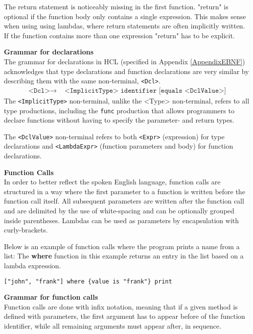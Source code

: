 The return statement is noticeably missing in the first function.
"return" is optional if the function body only contains a single expression. 
This makes sense when using using lambdas, where return statements are often implicitly written. 
If the function contains more than one expression "return" has to be explicit.


\textbf{Grammar for declarations}\\
The grammar for declarations in HCL (specified in Appendix \ref{AppendixEBNF}) acknowledges that type declarations and function declarations are very similar by describing them with the same non-terminal, \texttt{<Dcl>}.
\begin{align*}
	\texttt{<Dcl>}\to & \texttt{ <ImplicitType> identifier [equals <DclValue>]}
\end{align*}
The \texttt{<ImplicitType>} non-terminal, unlike the <Type> non-terminal, refers to all type productions, including the \texttt{func} production that allows programmers to declare functions without having to specify the parameter- and return types.

The \texttt{<DclValue>} non-terminal refers to both \texttt{<Expr>} (expression) for type declarations and \texttt{<LambdaExpr>} (function parameters and body) for function declarations.

\textbf{Function Calls}\\
In order to better reflect the spoken English language, function calls are structured in a way where the first parameter to a function is written before the function call itself.
All subsequent parameters are written after the function call and are delimited by the use of white-spacing and can be optionally grouped inside parentheses.
Lambdas can be used as parameters by encapsulation with curly-brackets. 

Below is an example of function calls where the program prints a name from a list:
The \textbf{where} function in this example returns an entry in the list based on a lambda expression.
\begin{lstlisting}
["john", "frank"] where {value is "frank"} print
\end{lstlisting}

\textbf{Grammar for function calls}\\
Function calls are done with infix notation, meaning that if a given method is defined with parameters, the first argument has to appear before of the function identifier, while all remaining arguments must appear after, in sequence.


